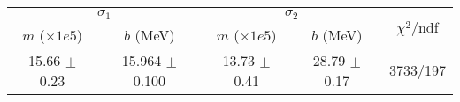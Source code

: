 \begin{tabular}{cc|cc||c}
\multicolumn{2}{c|}{$\sigma_1$} & \multicolumn{2}{|c}{$\sigma_2$}  & \multirow{2}{*}{$\chi^2/$ndf}\\
$m$ ($\times1e5$) & $b$ (MeV) & $m$ ($\times1e5$) & $b$ (MeV)  & \\
\hline
15.66 $\pm$ 0.23 & 15.964 $\pm$ 0.100 & 13.73 $\pm$ 0.41 & 28.79 $\pm$ 0.17 & 3733/197\\
\end{tabular}
